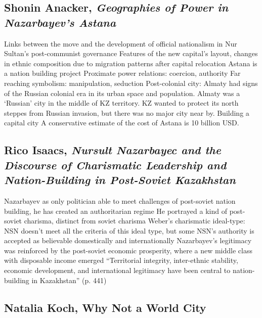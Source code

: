 \documentclass{article}
\begin{document}
\subsection{Shonin Anacker, \textit{Geographies of Power in Nazarbayev's Astana}}\cite{anacker2004geographies}

\begin{outline}
	\1 Links between the move and the development of official nationalism in Nur Sultan's post-communist governance 
	\1 Features of the new capital's layout, changes in ethnic composition due to migration patterns after capital relocation
	\1 Astana is a nation building project
		\2 Proximate power relations: coercion, authority
		\2 Far reaching symbolism: manipulation, seduction
	\1 Post-colonial city: Almaty had signs of the Russian colonial era in its urban space and population. Almaty was a `Russian' city in the middle of KZ territory. KZ wanted to protect its north steppes from Russian invasion, but there was no major city near by. 
	\1 Building a capital city
		\2 A conservative estimate of the cost of Astana is 10 billion USD. 
\end{outline}

\subsection{Rico Isaacs, \textit{Nursult Nazarbayec and the Discourse of Charismatic Leadership and Nation-Building in Post-Soviet Kazakhstan}}\cite{isaacs2010papa}

\begin{outline}
	\1 Nazarbayev as only politician able to meet challenges of post-soviet nation building, he has created an authoritarian regime
		\2 He portrayed a kind of post-soviet charisma, distinct from soviet charisma
		\2 Weber's charismatic ideal-type: NSN doesn't meet all the criteria of this ideal type, but some
	\1 NSN's authority is accepted as believable domestically and internationally
	\1 Nazarbayev's legitimacy was reinforced by the post-soviet economic prosperity, where a new middle class with disposable income emerged 
	\1 ``Territorial integrity, inter-ethnic stability, economic development, and international legitimacy have been central to nation-building in Kazakhstan'' (p. 441)
\end{outline}

\subsection{Natalia Koch, Why Not a World City}\cite{koch2013not}
\end{document}
